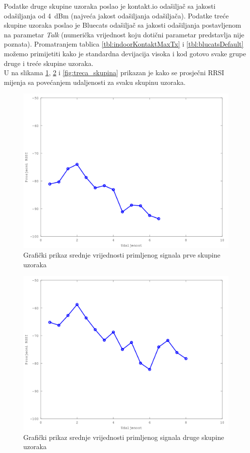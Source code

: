 Podatke druge skupine uzoraka poslao je kontakt.io odašiljač sa jakosti odašiljanja od \SI{4}{dBm} (najveća jakost odašiljanja odašiljača). 
Podatke treće skupine uzoraka poslao je Bluecats odašiljač sa jakosti odašiljanja postavljenom na parametar \textit{Talk} (numerička vrijednost koju dotični parametar predstavlja nije poznata). 
Promatranjem tablica \ref{tbl:indoorKontaktMaxTx} i \ref{tbl:blucatsDefault} možemo primijetiti kako je standardna devijacija visoka i kod gotovo svake grupe druge i treće skupine uzoraka.
\\
U na slikama \ref{fig:prva_skupina}, \ref{fig:druga_skupina} i \ref{fig:treca_skupina} prikazan je kako se prosječni RRSI mijenja sa povećanjem udaljenosti za svaku skupinu uzoraka.

\begin{figure}[H]
    \centering
    \includegraphics[scale=0.62]{pictures/prva-skupina-uzoraka}
    \caption{Grafički prikaz srednje vrijednosti primljenog signala prve skupine uzoraka}
    \label{fig:prva_skupina}
\end{figure}

\begin{figure}[H]
    \centering
    \includegraphics[scale=0.62]{pictures/druga-skupina-uzoraka}
    \caption{Grafički prikaz srednje vrijednosti primljenog signala druge skupine uzoraka}
    \label{fig:druga_skupina}
\end{figure}

